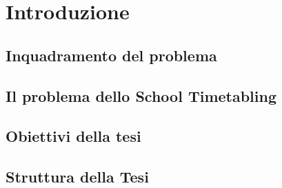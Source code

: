 \chapter*{Introduzione}
\label{chap:introduzione}

\section*{Inquadramento del problema}

\section*{Il problema dello School Timetabling}

\section*{Obiettivi della tesi}

\section*{Struttura della Tesi}
